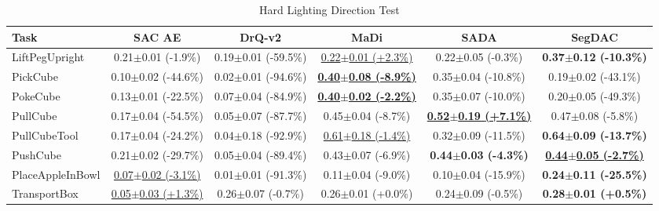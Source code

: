 \begin{table}[htbp]
\centering
\scriptsize
\caption{Hard Lighting Direction Test}
\label{tab:appendix_lightingdirectiontest_hard}
\begin{adjustbox}{max width=\textwidth}
\begin{tabular}{l*{5}{c}}
\toprule
\textbf{Task} & \textbf{SAC AE} & \textbf{DrQ-v2} & \textbf{MaDi} & \textbf{SADA} & \textbf{SegDAC} \\
\midrule
LiftPegUpright & 0.21$\pm$0.01 \scriptsize{(-1.9\%)} & 0.19$\pm$0.01 \scriptsize{(-59.5\%)} & \underline{0.22$\pm$0.01 \scriptsize{(+2.3\%)}} & 0.22$\pm$0.05 \scriptsize{(-0.3\%)} & \textbf{0.37$\pm$0.12 \scriptsize{(-10.3\%)}} \\
PickCube & 0.10$\pm$0.02 \scriptsize{(-44.6\%)} & 0.02$\pm$0.01 \scriptsize{(-94.6\%)} & \textbf{\underline{0.40$\pm$0.08 \scriptsize{(-8.9\%)}}} & 0.35$\pm$0.04 \scriptsize{(-10.8\%)} & 0.19$\pm$0.02 \scriptsize{(-43.1\%)} \\
PokeCube & 0.13$\pm$0.01 \scriptsize{(-22.5\%)} & 0.07$\pm$0.04 \scriptsize{(-84.9\%)} & \textbf{\underline{0.40$\pm$0.02 \scriptsize{(-2.2\%)}}} & 0.35$\pm$0.07 \scriptsize{(-10.0\%)} & 0.20$\pm$0.05 \scriptsize{(-49.3\%)} \\
PullCube & 0.17$\pm$0.04 \scriptsize{(-54.5\%)} & 0.05$\pm$0.07 \scriptsize{(-87.7\%)} & 0.45$\pm$0.04 \scriptsize{(-8.7\%)} & \textbf{\underline{0.52$\pm$0.19 \scriptsize{(+7.1\%)}}} & 0.47$\pm$0.08 \scriptsize{(-5.8\%)} \\
PullCubeTool & 0.17$\pm$0.04 \scriptsize{(-24.2\%)} & 0.04$\pm$0.18 \scriptsize{(-92.9\%)} & \underline{0.61$\pm$0.18 \scriptsize{(-1.4\%)}} & 0.32$\pm$0.09 \scriptsize{(-11.5\%)} & \textbf{0.64$\pm$0.09 \scriptsize{(-13.7\%)}} \\
PushCube & 0.21$\pm$0.02 \scriptsize{(-29.7\%)} & 0.05$\pm$0.04 \scriptsize{(-89.4\%)} & 0.43$\pm$0.07 \scriptsize{(-6.9\%)} & \textbf{0.44$\pm$0.03 \scriptsize{(-4.3\%)}} & \textbf{\underline{0.44$\pm$0.05 \scriptsize{(-2.7\%)}}} \\
PlaceAppleInBowl & \underline{0.07$\pm$0.02 \scriptsize{(-3.1\%)}} & 0.01$\pm$0.01 \scriptsize{(-91.3\%)} & 0.11$\pm$0.04 \scriptsize{(-9.0\%)} & 0.10$\pm$0.04 \scriptsize{(-15.9\%)} & \textbf{0.24$\pm$0.11 \scriptsize{(-25.5\%)}} \\
TransportBox & \underline{0.05$\pm$0.03 \scriptsize{(+1.3\%)}} & 0.26$\pm$0.07 \scriptsize{(-0.7\%)} & 0.26$\pm$0.01 \scriptsize{(+0.0\%)} & 0.24$\pm$0.09 \scriptsize{(-0.5\%)} & \textbf{0.28$\pm$0.01 \scriptsize{(+0.5\%)}} \\
\bottomrule
\end{tabular}
\end{adjustbox}
\end{table}

